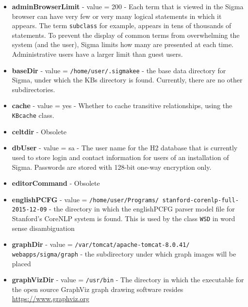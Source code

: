 \documentclass{book}
\begin{document}
\begin{itemize}

\item \textbf{adminBrowserLimit} - value = 200 - Each term that is viewed in the
Sigma browser can have very few or very many logical statements in which it
appears.  The term \texttt{subclass} for example, appears in tens of thousands
of statements.  To prevent the display of common terms from overwhelming the
system (and the user), Sigma limits how many are presented at each time.
Administrative users have a larger limit than guest users.

\item \textbf{baseDir} - value = \texttt{/home/user/.sigmakee} - the base data
directory for Sigma, under which the KBs directory is found.  Currently, there
are no other subdirectories.

\item \textbf{cache} - value = yes - Whether to cache transitive relationships,
using the \texttt{KBcache} class.

\item \textbf{celtdir} - Obsolete

\item \textbf{dbUser} - value = sa - The user name for the H2 database that is
currently used to store login and contact information for users of an
installation of Sigma.  Passwords are stored with 128-bit one-way encryption
only.

\item \textbf{editorCommand}  - Obsolete

\item \begin{sloppypar}\textbf{englishPCFG} - value =
\texttt{/home/user/Programs/ stanford-corenlp-full-2015-12-09} - the directory in
which the englishPCFG parser model file for Stanford's CoreNLP system is found.
This is used by the class \texttt{WSD} in word sense
disambiguation\end{sloppypar}

\item \begin{sloppypar}\textbf{graphDir} - value =
\texttt{/var/tomcat/apache-tomcat-8.0.41/ webapps/sigma/graph} - the subdirectory
under which graph images will be placed\end{sloppypar}

  \item \textbf{graphVizDir} - value = \texttt{/usr/bin} - The directory in which the
executable for the open source GraphViz graph drawing software resides 
\url{https://www.graphviz.org}


\end{itemize}
\end{document}
